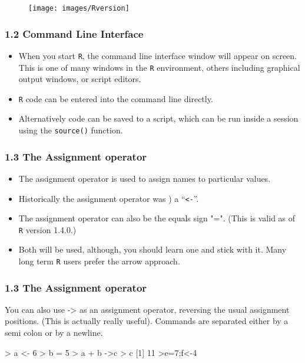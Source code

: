 \documentclass{beamer}
\begin{document}
 	
 	\begin{frame}
 		\begin{figure}
 			\centering
 			\texttt{[image: images/Rversion]}        
 		\end{figure}
 	\end{frame}  
 	\begin{frame}
 		
 		\frametitle{1.2 Command Line Interface}
 		\begin{itemize}
 			\item When you start \texttt{R}, the command line interface window will appear on screen. This is one
 			of many windows in the \texttt{R} environment, others including graphical output windows, or script
 			editors. 
 			\item \texttt{R} code can be entered into the command line directly. 
 			\item Alternatively code can be saved
 			to a script, which can be run inside a session using the \texttt{source()} function.
 		\end{itemize}
 	\end{frame}
 	\begin{frame}
 		\frametitle{1.3 The Assignment operator}
 		\begin{itemize}
 			\item The assignment operator is used to assign names to particular values. 
 			\item Historically the assignment
 			operator was ) a ``\texttt{<-}”. 
 			\item The assignment operator can also be the equals sign "=". (This is valid as of \texttt{R}
 			version 1.4.0.)
 			
 			\item Both will be used, although, you should learn one and stick with it. Many long term \texttt{R}
 			users prefer the arrow approach. 
 		\end{itemize}
 	\end{frame}
 	
 	\begin{frame}[fragile]
 		\frametitle{1.3 The Assignment operator}
 		
 		You can also use -> as an assignment operator, reversing the
 		usual assignment positions. (This is actually really useful). Commands are separated either by
 		a semi colon or by a newline.
 		\begin{framed}
 			\begin{semiverbatim}
 				> a <- 6
 				> b = 5
 				> a + b ->c
 				> c
 				[1] 11
 				>e=7;f<-4
 			\end{semiverbatim}
 		\end{framed}
 	\end{frame}
 
\end{document}
